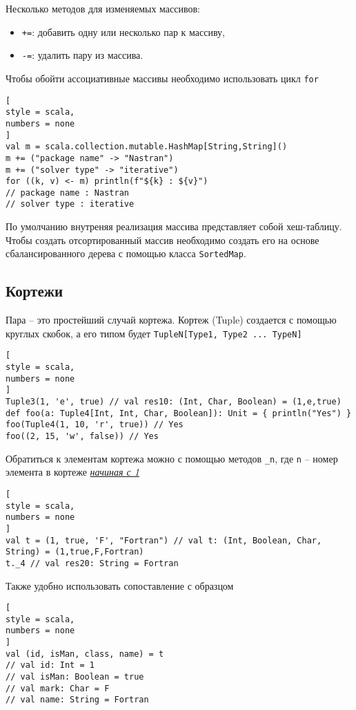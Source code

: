 \documentclass[%
	11pt,
	a4paper,
	utf8,
		]{article}
\begin{document}
Несколько методов для изменяемых массивов:
\begin{itemize}
	\item \texttt{+=}: добавить одну или несколько пар к массиву,
	
	\item \texttt{-=}: удалить пару из массива.
\end{itemize}

Чтобы обойти ассоциативные массивы необходимо использовать цикл \texttt{for}
\begin{lstlisting}[
style = scala,
numbers = none
]
val m = scala.collection.mutable.HashMap[String,String]()
m += ("package name" -> "Nastran")
m += ("solver type" -> "iterative")
for ((k, v) <- m) println(f"${k} : ${v}")
// package name : Nastran
// solver type : iterative
\end{lstlisting}

По умолчанию внутреняя реализация массива представляет собой хеш-таблицу. Чтобы создать отсортированный массив необходимо создать его на основе сбалансированного дерева с помощью класса \texttt{SortedMap}.

\subsection{Кортежи}

Пара -- это простейший случай кортежа. Кортеж (Tuple) создается с помощью круглых скобок, а его типом будет \texttt{TupleN[Type1, Type2 ... TypeN]}
\begin{lstlisting}[
style = scala,
numbers = none
]
Tuple3(1, 'e', true) // val res10: (Int, Char, Boolean) = (1,e,true)
def foo(a: Tuple4[Int, Int, Char, Boolean]): Unit = { println("Yes") }
foo(Tuple4(1, 10, 'r', true)) // Yes
foo((2, 15, 'w', false)) // Yes
\end{lstlisting}

Обратиться к элементам кортежа можно с помощью методов \verb|_n|, где \verb|n| -- номер элемента в кортеже \underline{\itshape начиная с 1}
\begin{lstlisting}[
style = scala,
numbers = none
]
val t = (1, true, 'F', "Fortran") // val t: (Int, Boolean, Char, String) = (1,true,F,Fortran)
t._4 // val res20: String = Fortran
\end{lstlisting}

Также удобно использовать сопоставление с образцом
\begin{lstlisting}[
style = scala,
numbers = none
]
val (id, isMan, class, name) = t
// val id: Int = 1
// val isMan: Boolean = true
// val mark: Char = F
// val name: String = Fortran
\end{lstlisting}
\end{document}
